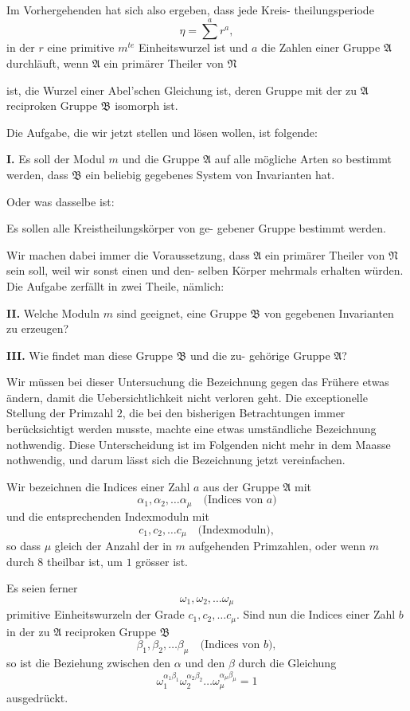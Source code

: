 \documentclass[12pt,a4paper]{article}
\begin{document}
Im Vorhergehenden hat sich also ergeben, dass jede Kreis-
theilungsperiode
\[
\eta = \sum^{a} r^a,
\]
in der $r$ eine primitive $m^{te}$ Einheitswurzel ist und $a$ die Zahlen
einer Gruppe $\mathfrak{A}$ durchläuft, wenn $\mathfrak{A}$ ein primärer Theiler von $\mathfrak{N}$

\newpage

ist, die Wurzel einer Abel'schen Gleichung ist, deren Gruppe mit
der zu $\mathfrak{A}$ reciproken Gruppe $\mathfrak{B}$ isomorph ist.

Die Aufgabe, die wir jetzt stellen und lösen wollen, ist
folgende:

\medskip
\noindent\textbf{I.} Es soll der Modul $m$ und die Gruppe $\mathfrak{A}$ auf alle
mögliche Arten so bestimmt werden, dass $\mathfrak{B}$ ein
beliebig gegebenes System von Invarianten hat.

Oder was dasselbe ist:

Es sollen alle Kreistheilungskörper von ge-
gebener Gruppe bestimmt werden.

Wir machen dabei immer die Voraussetzung, dass $\mathfrak{A}$ ein
primärer Theiler von $\mathfrak{N}$ sein soll, weil wir sonst einen und den-
selben Körper mehrmals erhalten würden. Die Aufgabe zerfällt
in zwei Theile, nämlich:

\medskip
\noindent\textbf{II.} Welche Moduln $m$ sind geeignet, eine Gruppe $\mathfrak{B}$
von gegebenen Invarianten zu erzeugen?

\medskip
\noindent\textbf{III.} Wie findet man diese Gruppe $\mathfrak{B}$ und die zu-
gehörige Gruppe $\mathfrak{A}$?

Wir müssen bei dieser Untersuchung die Bezeichnung gegen
das Frühere etwas ändern, damit die Uebersichtlichkeit nicht
verloren geht. Die exceptionelle Stellung der Primzahl $2$, die
bei den bisherigen Betrachtungen immer berücksichtigt werden
musste, machte eine etwas umständliche Bezeichnung nothwendig.
Diese Unterscheidung ist im Folgenden nicht mehr in dem
Maasse nothwendig, und darum lässt sich die Bezeichnung jetzt
vereinfachen.

Wir bezeichnen die Indices einer Zahl $a$ aus der Gruppe
$\mathfrak{A}$ mit
\[\alpha_1, \alpha_2, \ldots \alpha_\mu \quad \text{(Indices von $a$)}\]
und die entsprechenden Indexmoduln mit
\[c_1, c_2, \ldots c_\mu \quad \text{(Indexmoduln)},\]
so dass $\mu$ gleich der Anzahl der in $m$ aufgehenden Primzahlen,
oder wenn $m$ durch $8$ theilbar ist, um $1$ grösser ist.

Es seien ferner
\[\omega_1, \omega_2, \ldots \omega_\mu\]
primitive Einheitswurzeln der Grade $c_1, c_2, \ldots c_\mu$. Sind nun die
Indices einer Zahl $b$ in der zu $\mathfrak{A}$ reciproken Gruppe $\mathfrak{B}$
\[\beta_1, \beta_2, \ldots \beta_\mu \quad \text{(Indices von $b$)},\]
so ist die Beziehung zwischen den $\alpha$ und den $\beta$ durch die
Gleichung
\begin{equation}\label{eq:k21-1}
\omega_1^{\alpha_1\beta_1} \omega_2^{\alpha_2\beta_2} \ldots \omega_\mu^{\alpha_\mu\beta_\mu} = 1
\end{equation}
ausgedrückt.
\end{document}
